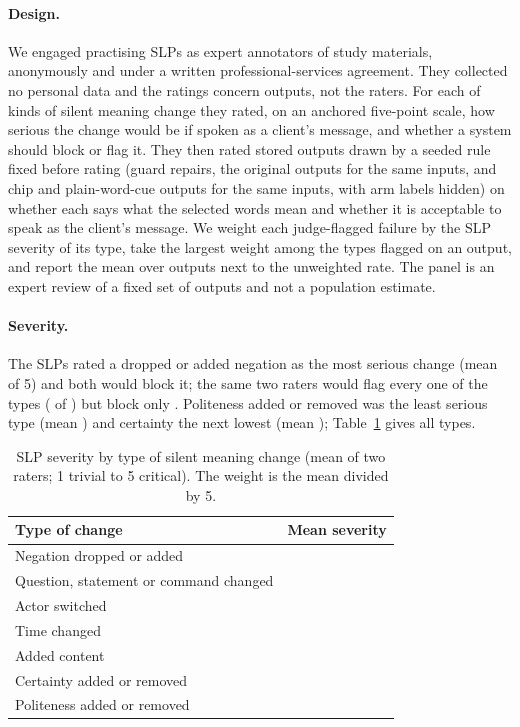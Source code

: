 \paragraph{Design.}
We engaged \jmdesignSlp{} practising SLPs as expert annotators of study materials, anonymously and under a written professional-services agreement.
They collected no personal data and the ratings concern outputs, not the raters.
For each of \jmslpTypesN{} kinds of silent meaning change they rated, on an anchored five-point scale, how serious the change would be if spoken as a client's message, and whether a system should block or flag it.
They then rated \jmslpItemsRated{} stored outputs drawn by a seeded rule fixed before rating (guard repairs, the original outputs for the same inputs, and chip and plain-word-cue outputs for the same inputs, with arm labels hidden) on whether each says what the selected words mean and whether it is acceptable to speak as the client's message.
We weight each judge-flagged failure by the SLP severity of its type, take the largest weight among the types flagged on an output, and report the mean over outputs next to the unweighted rate.
The panel is an expert review of a fixed set of outputs and not a population estimate.

\paragraph{Severity.}
The SLPs rated a dropped or added negation as the most serious change (mean \jmslpNegSeverity{} of 5) and both would block it; the same two raters would flag every one of the \jmslpTypesN{} types (\jmslpFlagTypesK{} of \jmslpTypesN{}) but block only \jmslpBlockTypesK{}.
Politeness added or removed was the least serious type (mean \jmslpSevPolite{}) and certainty the next lowest (mean \jmslpSevCert{}); Table~\ref{tab:s4-sev} gives all types.

\begin{table}[t]
\centering\small
\caption{SLP severity by type of silent meaning change (mean of two raters; 1 trivial to 5 critical). The weight is the mean divided by 5.}\label{tab:s4-sev}
\begin{tabular}{@{}lr@{}}
\toprule
Type of change & Mean severity \\
\midrule
Negation dropped or added & \jmslpNegSeverity{} \\
Question, statement or command changed & \jmslpSevSent{} \\
Actor switched & \jmslpSevActor{} \\
Time changed & \jmslpSevTime{} \\
Added content & \jmslpSevAdded{} \\
Certainty added or removed & \jmslpSevCert{} \\
Politeness added or removed & \jmslpSevPolite{} \\
\bottomrule
\end{tabular}
\end{table}

